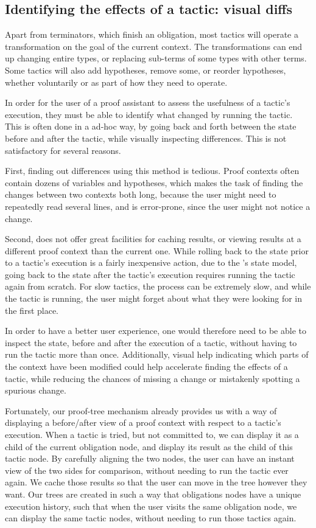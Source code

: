 \subsection{Identifying the effects of a tactic: visual diffs}\label{peacoq-design-diffs}

Apart from terminators, which finish an obligation, most tactics will operate a
transformation on the goal of the current context.  The transformations can end
up changing entire types, or replacing sub-terms of some types with other terms.
Some tactics will also add hypotheses, remove some, or reorder hypotheses,
whether voluntarily or as part of how they need to operate.

In order for the user of a proof assistant to assess the usefulness of a
tactic's execution, they must be able to identify what changed by running the
tactic.  This is often done in a ad-hoc way, by going back and forth between the
state before and after the tactic, while visually inspecting differences.  This
is not satisfactory for several reasons.

First, finding out differences using this method is tedious.  Proof contexts
often contain dozens of variables and hypotheses, which makes the task of
finding the changes between two contexts both long, because the user might need
to repeatedly read several lines, and is error-prone, since the user might not
notice a change.

Second, \Coq{} does not offer great facilities for caching results, or viewing
results at a different proof context than the current one.  While rolling back
to the state prior to a tactic's execution is a fairly inexpensive action, due
to the \Coq{}'s state model, going back to the state after the tactic's
execution requires running the tactic again from scratch.  For slow tactics, the
process can be extremely slow, and while the tactic is running, the user might
forget about what they were looking for in the first place.

In order to have a better user experience, one would therefore need to be able
to inspect the state, before and after the execution of a tactic, without having
to run the tactic more than once.  Additionally, visual help indicating which
parts of the context have been modified could help accelerate finding the
effects of a tactic, while reducing the chances of missing a change or
mistakenly spotting a spurious change.

Fortunately, our proof-tree mechanism already provides us with a way of
displaying a before/after view of a proof context with respect to a tactic's
execution.  When a tactic is tried, but not committed to, we can display it as a
child of the current obligation node, and display its result as the child of
this tactic node.  By carefully aligning the two nodes, the user can have an
instant view of the two sides for comparison, without needing to run the tactic
ever again.  We cache those results so that the user can move in the tree
however they want.  Our trees are created in such a way that obligations nodes
have a unique execution history, such that when the user visits the same
obligation node, we can display the same tactic nodes, without needing to run
those tactics again.

